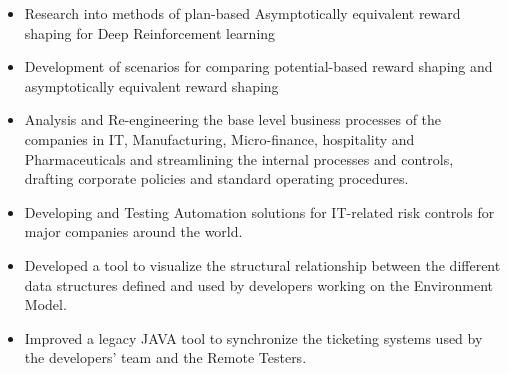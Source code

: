 
\begin{itemize}
\item Research into methods of plan-based Asymptotically equivalent reward shaping for Deep Reinforcement learning
\item Development of scenarios for comparing potential-based reward shaping and asymptotically equivalent reward shaping
\end{itemize}

\divider

\begin{itemize}
\item Analysis and Re-engineering the base level business processes of the companies in IT, Manufacturing, Micro-finance, hospitality and Pharmaceuticals and streamlining the internal processes
and controls, drafting corporate policies and standard operating procedures.
\item Developing and Testing Automation solutions for IT-related risk controls for major companies around
the world.


\end{itemize}

\divider

\begin{itemize}
\item Developed a tool to visualize the structural relationship between the different data structures defined and used by developers working on the Environment Model.
\item Improved a legacy JAVA tool to synchronize the ticketing systems used by the developers' team and the Remote Testers.
\end{itemize}

\divider


